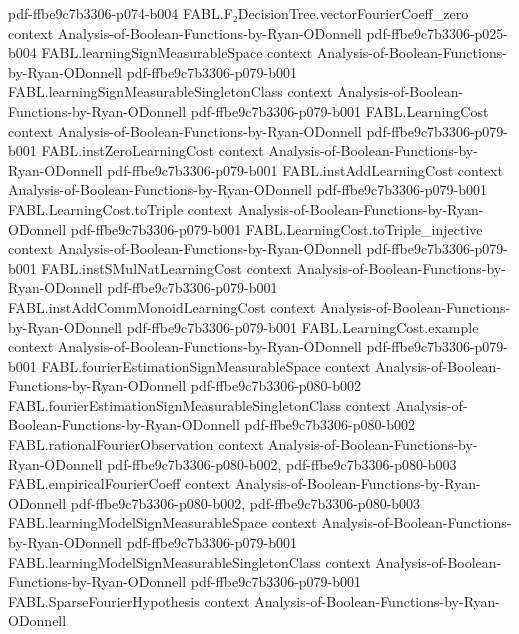 \begin{theorem}
  {pdf-ffbe9c7b3306-p074-b004}
\proofstep
  {FABL.F₂DecisionTree.vectorFourierCoeff_zero}
  {context}
  {Analysis-of-Boolean-Functions-by-Ryan-ODonnell}
  {pdf-ffbe9c7b3306-p025-b004}
\proofstep
  {FABL.learningSignMeasurableSpace}
  {context}
  {Analysis-of-Boolean-Functions-by-Ryan-ODonnell}
  {pdf-ffbe9c7b3306-p079-b001}
\proofstep
  {FABL.learningSignMeasurableSingletonClass}
  {context}
  {Analysis-of-Boolean-Functions-by-Ryan-ODonnell}
  {pdf-ffbe9c7b3306-p079-b001}
\proofstep
  {FABL.LearningCost}
  {context}
  {Analysis-of-Boolean-Functions-by-Ryan-ODonnell}
  {pdf-ffbe9c7b3306-p079-b001}
\proofstep
  {FABL.instZeroLearningCost}
  {context}
  {Analysis-of-Boolean-Functions-by-Ryan-ODonnell}
  {pdf-ffbe9c7b3306-p079-b001}
\proofstep
  {FABL.instAddLearningCost}
  {context}
  {Analysis-of-Boolean-Functions-by-Ryan-ODonnell}
  {pdf-ffbe9c7b3306-p079-b001}
\proofstep
  {FABL.LearningCost.toTriple}
  {context}
  {Analysis-of-Boolean-Functions-by-Ryan-ODonnell}
  {pdf-ffbe9c7b3306-p079-b001}
\proofstep
  {FABL.LearningCost.toTriple_injective}
  {context}
  {Analysis-of-Boolean-Functions-by-Ryan-ODonnell}
  {pdf-ffbe9c7b3306-p079-b001}
\proofstep
  {FABL.instSMulNatLearningCost}
  {context}
  {Analysis-of-Boolean-Functions-by-Ryan-ODonnell}
  {pdf-ffbe9c7b3306-p079-b001}
\proofstep
  {FABL.instAddCommMonoidLearningCost}
  {context}
  {Analysis-of-Boolean-Functions-by-Ryan-ODonnell}
  {pdf-ffbe9c7b3306-p079-b001}
\proofstep
  {FABL.LearningCost.example}
  {context}
  {Analysis-of-Boolean-Functions-by-Ryan-ODonnell}
  {pdf-ffbe9c7b3306-p079-b001}
\proofstep
  {FABL.fourierEstimationSignMeasurableSpace}
  {context}
  {Analysis-of-Boolean-Functions-by-Ryan-ODonnell}
  {pdf-ffbe9c7b3306-p080-b002}
\proofstep
  {FABL.fourierEstimationSignMeasurableSingletonClass}
  {context}
  {Analysis-of-Boolean-Functions-by-Ryan-ODonnell}
  {pdf-ffbe9c7b3306-p080-b002}
\proofstep
  {FABL.rationalFourierObservation}
  {context}
  {Analysis-of-Boolean-Functions-by-Ryan-ODonnell}
  {pdf-ffbe9c7b3306-p080-b002,
    pdf-ffbe9c7b3306-p080-b003}
\proofstep
  {FABL.empiricalFourierCoeff}
  {context}
  {Analysis-of-Boolean-Functions-by-Ryan-ODonnell}
  {pdf-ffbe9c7b3306-p080-b002,
    pdf-ffbe9c7b3306-p080-b003}
\proofstep
  {FABL.learningModelSignMeasurableSpace}
  {context}
  {Analysis-of-Boolean-Functions-by-Ryan-ODonnell}
  {pdf-ffbe9c7b3306-p079-b001}
\proofstep
  {FABL.learningModelSignMeasurableSingletonClass}
  {context}
  {Analysis-of-Boolean-Functions-by-Ryan-ODonnell}
  {pdf-ffbe9c7b3306-p079-b001}
\proofstep
  {FABL.SparseFourierHypothesis}
  {context}
  {Analysis-of-Boolean-Functions-by-Ryan-ODonnell}

\end{theorem}
